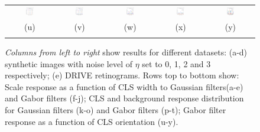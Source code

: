 \begin{figure}[t]
\begin{tabular}{@{}c c c c c@{}}
\includegraphics[width=0.18\textwidth]{figs/synthetic/syn_lines_gabor_ori_subbands_0} &
\includegraphics[width=0.18\textwidth]{figs/synthetic/syn_lines_gabor_ori_subbands_1} &
\includegraphics[width=0.18\textwidth]{figs/synthetic/syn_lines_gabor_ori_subbands_2} &
\includegraphics[width=0.18\textwidth]{figs/synthetic/syn_lines_gabor_ori_subbands_3} &
\includegraphics[width=0.18\textwidth]{figs/retina/ret_vessels_gabor_ori_subbands} \\
(u) & (v) & (w) & (x) & (y)\\
\noalign{\smallskip}

\end{tabular}
%
\caption{\emph{Columns from left to right} show results for different datasets: (a-d) synthetic images with noise level of $\eta$ set to 0, 1, 2 and 3 respectively; (e) DRIVE retinograms. Rows top to bottom show: Scale response as a function of CLS width to Gaussian filters(a-e) and Gabor filters (f-j); CLS and background response distribution for Gaussian filters (k-o) and Gabor filters (p-t); Gabor filter response as a function of CLS orientation (u-y).}
\label{f:synthetic_exp1}
\end{figure}
